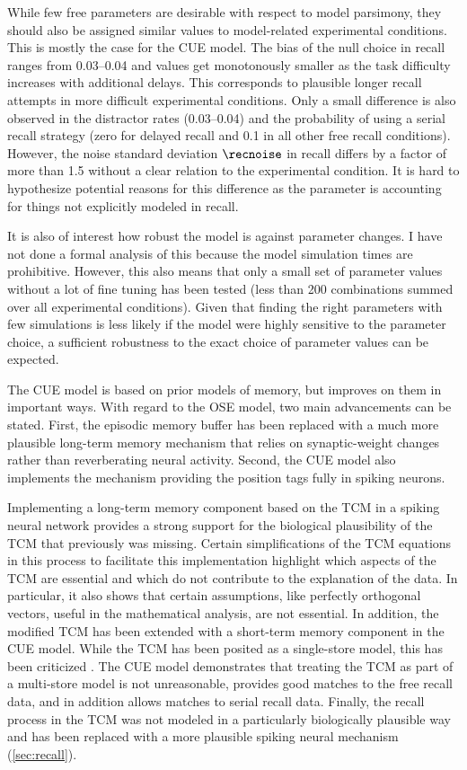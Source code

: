 While few free parameters are desirable with respect to model parsimony, they should also be assigned similar values to model-related experimental conditions.
This is mostly the case for the CUE model.
The bias of the null choice in recall ranges from \numrange{0.03}{0.04} and values get monotonously smaller as the task difficulty increases with additional delays.
This corresponds to plausible longer recall attempts in more difficult experimental conditions.
Only a small difference is also observed in the distractor rates (\numrange{0.03}{0.04}) and the probability of using a serial recall strategy (zero for delayed recall and \num{0.1} in all other free recall conditions).
However, the noise standard deviation $\recnoise$ in recall differs by a factor of more than \num{1.5} without a clear relation to the experimental condition.
It is hard to hypothesize potential reasons for this difference as the parameter is accounting for things not explicitly modeled in recall.

It is also of interest how robust the model is against parameter changes.
I have not done a formal analysis of this because the model simulation times are prohibitive.
However, this also means that only a small set of parameter values without a lot of fine tuning has been tested (less than \num{200} combinations summed over all experimental conditions).
Given that finding the right parameters with few simulations is less likely if the model were highly sensitive to the parameter choice, a sufficient robustness to the exact choice of parameter values can be expected.

The CUE model is based on prior models of memory, but improves on them in important ways.
With regard to the OSE model, two main advancements can be stated.
First, the episodic memory buffer has been replaced with a much more plausible long-term memory mechanism that relies on synaptic-weight changes rather than reverberating neural activity.
Second, the CUE model also implements the mechanism providing the position tags fully in spiking neurons.

Implementing a long-term memory component based on the TCM in a spiking neural network provides a strong support for the biological plausibility of the TCM that previously was missing.
Certain simplifications of the TCM equations in this process to facilitate this implementation highlight which aspects of the TCM are essential and which do not contribute to the explanation of the data.
In particular, it also shows that certain assumptions, like perfectly orthogonal vectors, useful in the mathematical analysis, are not essential.
In addition, the modified TCM has been extended with a short-term memory component in the CUE model.
While the TCM has been posited as a single-store model, this has been criticized \parencite{Davelaar2008}.
The CUE model demonstrates that treating the TCM as part of a multi-store model is not unreasonable, provides good matches to the free recall data, and in addition allows matches to serial recall data.
Finally, the recall process in the TCM was not modeled in a particularly biologically plausible way and has been replaced with a more plausible spiking neural mechanism (\cref{sec:recall}).

